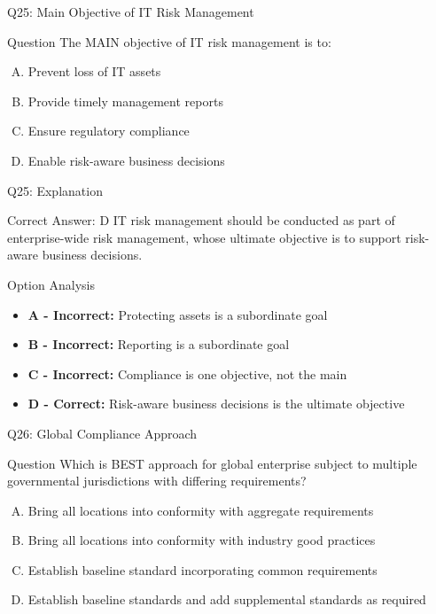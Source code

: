 \documentclass{beamer}
\begin{document}
	\begin{frame}{Q25: Main Objective of IT Risk Management}
		\begin{block}{Question}
			The MAIN objective of IT risk management is to:
		\end{block}
		\begin{enumerate}[(A)]
			\item Prevent loss of IT assets
			\item Provide timely management reports
			\item Ensure regulatory compliance
			\item Enable risk-aware business decisions
		\end{enumerate}
	\end{frame}
	
	\begin{frame}{Q25: Explanation}
		\begin{block}{Correct Answer: D}
			IT risk management should be conducted as part of enterprise-wide risk management, whose ultimate objective is to support risk-aware business decisions.
		\end{block}
		\begin{block}{Option Analysis}
			\begin{itemize}
				\item \textbf{A - Incorrect:} Protecting assets is a subordinate goal
				\item \textbf{B - Incorrect:} Reporting is a subordinate goal
				\item \textbf{C - Incorrect:} Compliance is one objective, not the main
				\item \textbf{D - Correct:} Risk-aware business decisions is the ultimate objective
			\end{itemize}
		\end{block}
	\end{frame}
	
	\begin{frame}{Q26: Global Compliance Approach}
		\begin{block}{Question}
			Which is BEST approach for global enterprise subject to multiple governmental jurisdictions with differing requirements?
		\end{block}
		\begin{enumerate}[(A)]
			\item Bring all locations into conformity with aggregate requirements
			\item Bring all locations into conformity with industry good practices
			\item Establish baseline standard incorporating common requirements
			\item Establish baseline standards and add supplemental standards as required
		\end{enumerate}
	\end{frame}
	
\end{document}
